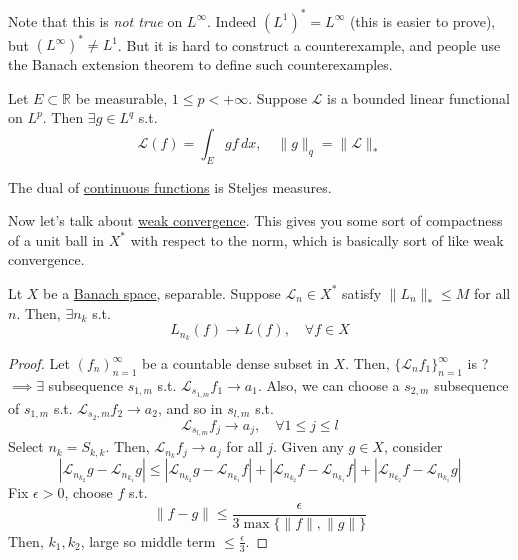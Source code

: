   Note that this is \textit{not true} on $L^\infty$. Indeed $(L^1)^\ast = L^\infty$ (this is easier to prove), but $(L^\infty)^\ast \neq L^1$. But it is hard to construct a counterexample, and people use the Banach extension theorem to define such counterexamples. 

  \begin{theorem}
    \label{thm:riesz-representation-theorem}
    Let $E \subset \mathbb{R}$ be measurable, $1 \leq p < +\infty$. Suppose $\mathcal{L}$ is a bounded linear functional on $L^p$. Then $\exists g \in L^q$ s.t. 
    \begin{equation}
      \mathcal{L}(f) = \int_E g f \,dx, \quad \|g\|_q = \|\mathcal{L}\|_\ast
    \end{equation}
  \end{theorem}

  The dual of \hyperref[pst-def:continuous_func]{continuous functions} is Steljes measures. 

  Now let's talk about \hyperref[def:weak-convergence]{weak convergence}. This gives you some sort of compactness of a unit ball in $X^\ast$ with respect to the norm, which is basically sort of like weak convergence. 

  \begin{theorem}[Helley]
    \label{thm:helley}
    Lt $X$ be a \hyperref[mv-def:banach-space]{Banach space}, separable. Suppose $\mathcal{L}_n \in X^\ast$ satisfy $\|L_n\|_\ast \leq M$ for all $n$. Then, $\exists n_k$ s.t. 
    \begin{equation}
      L_{n_k} (f) \to L (f), \quad \forall f \in X
    \end{equation}
  \end{theorem}
  \begin{proof}
    Let $(f_n)_{n=1}^\infty$ be a countable dense subset in $X$. Then, $\{\mathcal{L}_n f_1\}_{n=1}^\infty$ is ? $\implies \exists$ subsequence $s_{1, m}$ s.t. $\mathcal{L}_{s_{1, m}} f_1 \to a_1$. Also, we can choose a $s_{2, m}$ subsequence of $s_{1, m}$ s.t. $\mathcal{L}_{s_2, m} f_2 \to a_2$, and so in $s_{l, m}$ s.t. 
    \begin{equation}
      \mathcal{L}_{s_{l, m}} f_j \to a_j, \quad \forall 1 \leq j \leq l
    \end{equation}
    Select $n_k = S_{k, k}$. Then, $\mathcal{L}_{n_k} f_j \to a_j$ for all $j$. Given any $g \in X$, consider 
    \begin{equation}
      |\mathcal{L}_{n_{k_2}} g - \mathcal{L}_{n_{k_1}} g| \leq |\mathcal{L}_{n_{k_2}} g - \mathcal{L}_{n_{k_1}} f| + |\mathcal{L}_{n_{k_2}} f - \mathcal{L}_{n_{k_1}} f| + |\mathcal{L}_{n_{k_2}} f - \mathcal{L}_{n_{k_1}} g|
    \end{equation}
    Fix $\epsilon > 0$, choose $f$ s.t. 
    \begin{equation}
      \|f - g\| \leq \frac{\epsilon}{3 \max\{\|f\|, \|g\|\}}
    \end{equation}
    Then, $k_1, k_2$, large so middle term $\leq \frac{\epsilon}{3}$. 
  \end{proof}


